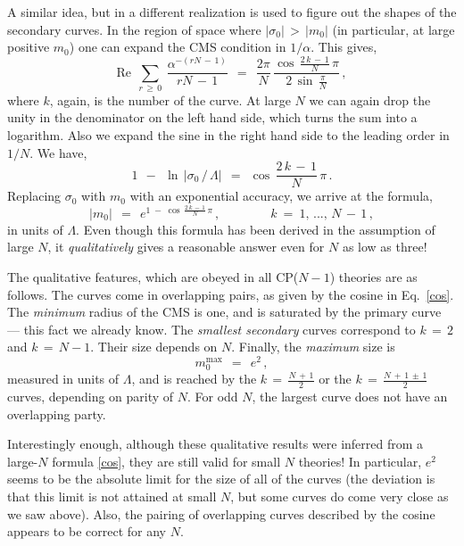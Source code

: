 \documentclass[epsfig,12pt]{article}
\def\beq{\begin{equation}}
\def\eeq{\end{equation}}
\def\beq{\begin{equation}}
\def\eeq{\end{equation}}
\begin{document}
	A similar idea, but in a different realization is used to figure out the shapes of the secondary curves.
	In the region of space where $ | \sigma_0 | \,>\, | m_0 | $ (in particular, at large positive $ m_0 $) one can expand 
	the CMS condition in $ 1/\alpha $.
	This gives,
\beq
	\text{Re}~~
	\sum_{r \,\ge\, 0}\: \frac{   \alpha^{ -( r N \,-\, 1) }   } 
                                  {\:         r N \,-\, 1        \:} ~~=~~
	\frac{ 2 \pi } { N }\,
	\frac{   \cos\, \frac{ 2\, k \,-\, 1 } { N }\, \pi   }
             {   2\, \sin\, \frac{ \pi }{ N }   }  
	\,,
\eeq
	where $ k $, again, is the number of the curve. 
	At large $ N $ we can again drop the unity in the denominator on the left hand side, 
	which turns the sum into a logarithm.
	Also we expand the sine in the right hand side to the leading order in $ 1/N $.
	We have,
\beq
	1 ~~-~~ \ln\, \big| \sigma_0 \,/\, \Lambda \big|  ~~=~~ \cos\, \frac{\scriptstyle 2\, k \,-\, 1 } {\scriptstyle N }\, \pi \,.
\eeq
	Replacing $ \sigma_0 $ with $ m_0 $ with an exponential accuracy, we arrive at the formula,
\beq
\label{cos}
	\big| m_0 \big| ~~=~~ e^{ 1 \;-\; \cos\, \frac{\scriptstyle 2\, k \,-\, 1 } {\scriptstyle N }\, {\scriptstyle \pi} }\,,
	\qquad\qquad 
	k ~=~ 1,\, ...,\, N\,-\,1\,,
\eeq
	in units of $ \Lambda $.
	Even though this formula has been derived in the assumption of large $ N $, it {\it qualitatively} gives 
	a reasonable answer even for $ N $ as low as three!
	
	The qualitative features, which are obeyed in all CP($ N - 1 $) theories are as follows.
	The curves come in overlapping pairs, as given by the cosine in Eq.~\eqref{cos}.
	The {\it minimum} radius of the CMS is one, and is saturated by the primary curve --- this fact we already know.
	The {\it smallest secondary} curves correspond to $ k \,=\, 2 $ and $ k \,=\, N - 1 $.
	Their size depends on $ N $.
	Finally, the {\it maximum} size is 
\beq
	m_0^\text{max} ~~=~~ e^2\,,
\eeq
	measured in units of $ \Lambda $, and is reached by the 
	$ k \,=\, \frac{ N \,+\, 1 } { 2 } $ or the
	$ k \,=\, \frac{ N \,+\, 1 \,\pm\, 1 } { 2 } $
	curves, depending on parity of $ N $.
	For odd $ N $, the largest curve does not have an overlapping party.

	Interestingly enough, although these qualitative results were inferred from a large-$ N $ formula \eqref{cos},
	they are still valid for small $ N $ theories!
	In particular, $ e^2 $ seems to be the absolute limit for the size of all of the curves 
	(the deviation is that this limit is not attained at small $ N $, but some curves do come very close 
	as we saw above).
	Also, the pairing of overlapping curves described by the cosine appears to be correct for any $ N $.
\end{document}
